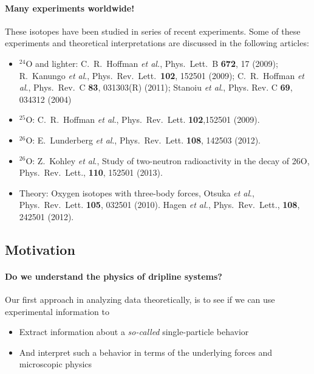 \documentclass[%
twoside,                 %
final,                   %
10pt]{article}
\begin{document}
\paragraph{Many experiments worldwide!}
These isotopes have been studied in series of recent experiments. Some of these experiments and theoretical interpretations are discussed in the following articles:

\begin{itemize}
\item ${}^{24}\mbox{O}$ and lighter:  C.~R.~Hoffman \emph{et al.}, Phys.~Lett.~B \textbf{672}, 17 (2009); R.~Kanungo \emph{et al}., Phys.~Rev.~Lett.~\textbf{102}, 152501 (2009); C.~R.~Hoffman \emph{et al}., Phys.~Rev.~C \textbf{83}, 031303(R) (2011); Stanoiu \emph{et al}., Phys. Rev. C \textbf{69}, 034312 (2004)

\item ${}^{25}\mbox{O}$: C.~R.~Hoffman \emph{et al}., Phys.~Rev.~Lett. \textbf{102},152501  (2009). 

\item ${}^{26}\mbox{O}$: E.~Lunderberg \emph{et al}., Phys.~Rev.~Lett. \textbf{108}, 142503 (2012). 

\item ${}^{26}\mbox{O}$: Z.~Kohley  \emph{et al}., Study of two-neutron radioactivity in the decay of 26O, Phys.~Rev.~Lett., \textbf{110}, 152501 (2013). 

\item Theory: Oxygen isotopes with three-body forces,  Otsuka \emph{et al}., Phys.~Rev.~Lett. \textbf{105}, 032501  (2010).  Hagen \emph{et al.}, Phys.~Rev.~Lett., \textbf{108}, 242501 (2012). 
\end{itemize}

\noindent




\subsection*{Motivation}

\paragraph{Do we understand the physics of dripline systems?}
Our first approach in analyzing data theoretically, is to see if we can use experimental information to 

\begin{itemize}
\item Extract information about a \emph{so-called} single-particle  behavior

\item And interpret such a behavior in terms of the underlying forces and microscopic physics
\end{itemize}
\end{document}
